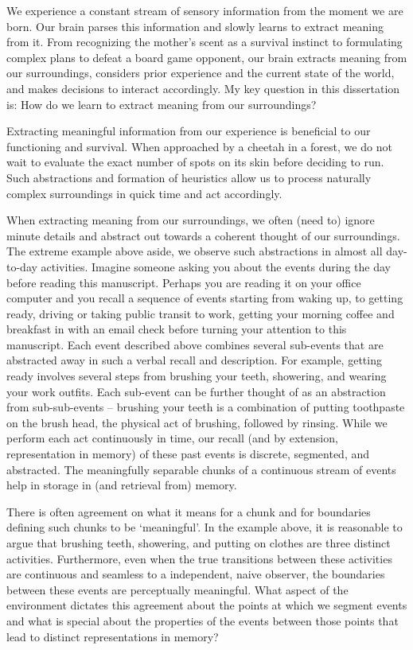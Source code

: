 We experience a constant stream of sensory information from the moment we are born. Our brain parses this information and slowly learns to extract meaning from it. From recognizing the mother's scent as a survival instinct to formulating complex plans to defeat a board game opponent, our brain extracts meaning from our surroundings, considers prior experience and the current state of the world, and makes decisions to interact accordingly. My key question in this dissertation is: How do we learn to extract meaning from our surroundings?

Extracting meaningful information from our experience is beneficial to our functioning and survival. When approached by a cheetah in a forest, we do not wait to evaluate the exact number of spots on its skin before deciding to run. Such abstractions and formation of heuristics allow us to process naturally complex surroundings in quick time and act accordingly.

When extracting meaning from our surroundings, we often (need to) ignore minute details and abstract out towards a coherent thought of our surroundings. The extreme example above aside, we observe such abstractions in almost all day-to-day activities. Imagine someone asking you about the events during the day before reading this manuscript. Perhaps you are reading it on your office computer and you recall a sequence of events starting from waking up, to getting ready, driving or taking public transit to work, getting your morning coffee and breakfast in with an email check before turning your attention to this manuscript. Each event described above combines several sub-events that are abstracted away in such a verbal recall and description. For example, getting ready involves several steps from brushing your teeth, showering, and wearing your work outfits. Each sub-event can be further thought of as an abstraction from sub-sub-events -- brushing your teeth is a combination of putting toothpaste on the brush head, the physical act of brushing, followed by rinsing. While we perform each act continuously in time, our recall (and by extension, representation in memory) of these past events is discrete, segmented, and abstracted. The meaningfully separable chunks of a continuous stream of events help in storage in (and retrieval from) memory.

There is often agreement on what it means for a chunk and for boundaries defining such chunks to be `meaningful'. In the example above, it is reasonable to argue that brushing teeth, showering, and putting on clothes are three distinct activities. Furthermore, even when the true transitions between these activities are continuous and seamless to a  independent, naive observer, the boundaries between these events are perceptually meaningful. What aspect of the environment dictates this agreement about the points at which we segment events and what is special about the properties of the events between those points that lead to distinct representations in memory?

